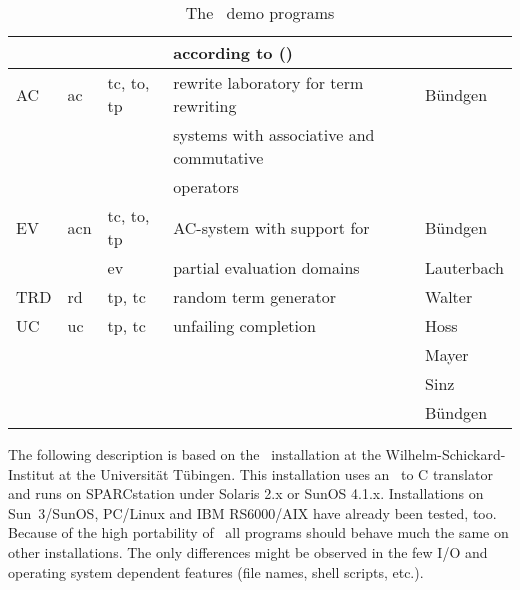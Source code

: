 \begin{table}
\begin{tabular}{|l|l|l|l|l|}
       &    &           & according to (\cite{Kuechlin:89}) & \\ 
  \hline
   AC   & ac &tc, to, tp & rewrite laboratory for term rewriting &B\"{u}ndgen \\
        &    &           & systems with associative and commutative& \\
        &    &           & operators & \\ 
  \hline
   EV   & acn &tc, to, tp & AC-system with support for &B\"{u}ndgen \\
        &    & ev        & partial evaluation domains  &Lauterbach  \\
  \hline
   TRD  & rd & tp, tc & random term generator & Walter \\
  \hline
   UC  & uc & tp, tc & unfailing completion & Hoss \\
       &    &       &                      & Mayer \\
       &    &       &                      & Sinz \\
       &    &       &                      & B\"{u}ndgen \\
  \hline
 \end{tabular}
 \caption{The \redux\  demo programs} \label{ta:dp}
\end{table}

The following description is based on the \redux\  installation at the
Wilhelm-Schickard-Institut at the Universit\"{a}t T\"{u}bingen.
This installation uses an \ALDES\ to C translator and runs on SPARCstation
under Solaris 2.x or SunOS 4.1.x.
Installations on Sun~3/SunOS, PC/Linux and
IBM RS6000/AIX have already been tested, too.
Because of the high portability of \ALDES\ all programs should behave much 
the same on other installations.
The only differences might be observed in the few I/O and operating system
dependent features (file names, shell scripts, etc.).
